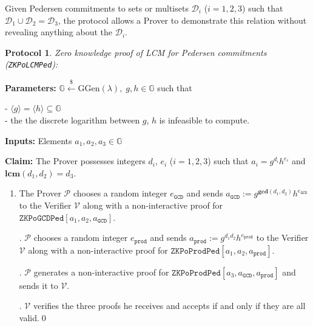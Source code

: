 \documentclass[11pt, lettersize, notitlepage, leqno, footskip=0.6cm]{article}
\newcommand{\ttt}{\texttt}
\newcommand{\bG}{\mathbb{G}}
\newcommand{\la}{\langle}
\newcommand{\ra}{\rangle}
\newcommand{\mc}{\mathcal}
\newcommand{\mb}{\mathbb}
\newcommand{\mbf}{\mathbf}
\newcommand{\mr}{\mathrm}
\newcommand{\lamb}{\lambda}
\newcommand{\sub}{\subseteq}
\newcommand{\mP}{\mc{P}}
\newcommand{\V}{\mc{V}}
\newcommand{\vs}{\vspace{-0.15cm}}
\newcommand{\noin}{\noindent}
\newcommand{\LCM}{\mbf{lcm}}
\newcommand{\GCD}{\mbf{gcd}}
\newtheorem{Prot}[Thm]{Protocol}
\numberwithin{equation}{section}
\begin{document}
Given Pedersen commitments to sets or multisets $\mc{D}_i$ ($i=1,2,3$) such that $\mc{D}_1\cup \mc{D}_2 = \mc{D}_3$, the protocol allows a Prover to demonstrate this relation without revealing anything about the $\mc{D}_i$.



\begin{Prot} \normalfont \hypertarget{PoLCMPed}{\textit{Zero knowledge proof of LCM for Pedersen commitments}} (\verb|ZKPoLCMPed|):\end{Prot} \vspace{-0.3cm}

\noin \textbf{Parameters:} $\mb{G}\xleftarrow{\$} \mr{GGen}(\lamb), \; g, h\in \mb{G}$ such that

\noin - $\la g \ra = \la h \ra\sub \bG$ \\
\noin - the the discrete logarithm between $g$, $h$ is infeasible to compute.

 
\noin \textbf{Inputs:} Elements $a_1,a_2,a_3\in \mb{G}$

\noin \textbf{Claim:} The Prover possesses integers $d_i$, $e_i$ ($i=1,2,3$) such that $a_i = g^{d_i}h^{e_i}$ and $\LCM(d_1,d_2) = d_3$.

\begin{enumerate}[wide, labelwidth=!, labelindent=0pt]\vs \item The Prover $\mP$ chooses a random integer $e_{\ttt{GCD}}$ and sends $a_{\ttt{GCD}}:= g^{\GCD(d_1,d_2)}h^{e_{\ttt{GCD}}}$ to the Verifier $\V$ along with a non-interactive proof for $\ttt{ZKPoGCDPed}[a_1,a_2,a_{\ttt{GCD}}]$.

\noin 2. $\mP$ chooses a random integer $e_{\ttt{prod}}$ and sends $a_{\ttt{prod}}:= g^{d_1d_2}h^{e_{\ttt{prod}}}$ to the Verifier $\V$ along with a non-interactive proof for $\ttt{ZKPoProdPed}[a_1,a_2,a_{\ttt{prod}}]$.

\noin 3. $\mP$ generates a non-interactive proof for $\ttt{ZKPoProdPed}[a_3,a_{\ttt{GCD}}, a_{\ttt{prod}}]$ and sends it to $\V$.

\noin 4. $\V$ verifies the three proofs he receives and accepts if and only if they are all valid.\qed \end{enumerate}



\end{document}
